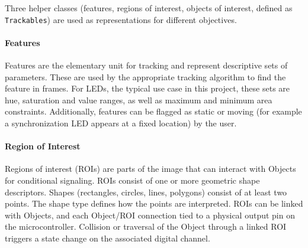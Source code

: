 Three helper classes (features, regions of interest, objects of interest, defined as \texttt{Trackables}) are used as representations for different objectives.

\paragraph{Features}
\label{sec:Features}
Features are the elementary unit for tracking and represent descriptive sets of parameters. These are used by the appropriate tracking algorithm to find the feature in frames. For LEDs, the typical use case in this project, these sets are hue, saturation and value ranges, as well as maximum and minimum area constraints. Additionally, features can be flagged as static or moving (for example a synchronization LED appears at a fixed location) by the user. %

\paragraph{Region of Interest}
\label{sec:RegionOfInterest}
Regions of interest (ROIs) are parts of the image that can interact with Objects for conditional signaling. ROIs consist of one or more geometric shape descriptors. Shapes (rectangles, circles, lines, polygons) consist of at least two points. The shape type defines how the points are interpreted. ROIs can be linked with Objects, and each Object/ROI connection tied to a physical output pin on the microcontroller. Collision or traversal of the Object through a linked ROI triggers a state change on the associated digital channel.


